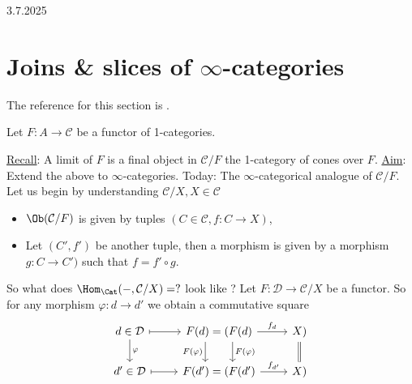 3.7.2025

\section{Joins \& slices of $\infty$-categories}

The reference for this section is \cite[3.4]{Cisinski_2019}.

Let $ F \colon A \to \mathcal{ C } $ be a functor of 1-categories.

\underline{Recall}:
\newline
A limit of $ F $ is a final object in $ \mathcal{ C } / F $ the 1-category of cones over $ F $.
\newline
\underline{Aim}:
\newline
Extend the above to $ \infty $-categories.
\newline
Today:
The $ \infty $-categorical analogue of $ \mathcal{ C } / F $.
Let us begin by understanding $ \mathcal{ C } / X , X \in \mathcal{ C } $
\begin{itemize}
	\item 
	$ \Ob ( \mathcal{ C } / F ) $ is given by tuples $ ( C \in \mathcal{ C } , f \colon C \to X ) $,
	
	\item 
	Let $ ( C' , f' ) $ be another tuple, then a morphism is given by a morphism $ g \colon C \to C' )$ such that $ f = f' \circ g $.
\end{itemize}

So what does $ \Hom_{ \Cat } ( - , \mathcal{ C } / X ) = ? $ look like ? 
Let $ F \colon \mathcal{ D } \to \mathcal{ C } / X $ be a functor.
So for any morphism $ \varphi \colon d \to d' $ we obtain a commutative square
\[
\begin{tikzcd}
	d \in \mathcal{ D }
	\ar[r, mapsto]
	\ar[d, "\varphi"]
	& 
	F ( d ) = ( F ( d ) 
	\ar[d, "F ( \varphi )"' , shift right=5]
	\ar[d, "F ( \varphi )" , shift left=5]
	\ar[r, "f_d"]
	&
	X )
	\ar[d, equal]
	\\
	d' \in \mathcal{ D } 
	\ar[r , mapsto ]
	&
	F ( d' ) = ( F ( d' ) 
	\ar[r , " f_{ d' } "] 
	&
	X )
\end{tikzcd}
\]


